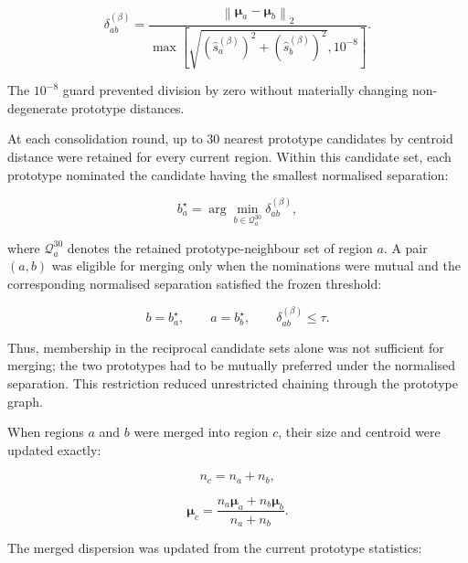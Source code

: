 \documentclass[10pt,a4paper,fleqn]{article}
\begin{document}
\begin{equation}
\delta_{ab}^{(\beta)}
=
\frac{
\left\|
\boldsymbol{\mu}_a-\boldsymbol{\mu}_b
\right\|_2
}{
\max
\left[
\sqrt{
\left(
\widehat{s}_a^{(\beta)}
\right)^2
+
\left(
\widehat{s}_b^{(\beta)}
\right)^2
},
10^{-8}
\right]
}.
\label{eq:prototype_distance}
\end{equation}

The \(10^{-8}\) guard prevented division by zero without materially changing
non-degenerate prototype distances.

At each consolidation round, up to 30 nearest prototype candidates by centroid
distance were retained for every current region. Within this candidate set,
each prototype nominated the candidate having the smallest normalised
separation:

\begin{equation}
b_a^{\star}
=
\arg\min_{b\in\mathcal{Q}^{30}_a}
\delta_{ab}^{(\beta)},
\label{eq:preferred_prototype}
\end{equation}

where \(\mathcal{Q}^{30}_a\) denotes the retained prototype-neighbour set of
region \(a\). A pair \((a,b)\) was eligible for merging only when the
nominations were mutual and the corresponding normalised separation satisfied
the frozen threshold:

\begin{equation}
b=b_a^{\star},
\qquad
a=b_b^{\star},
\qquad
\delta_{ab}^{(\beta)}\leq\tau.
\label{eq:reciprocal_merge_rule}
\end{equation}

Thus, membership in the reciprocal candidate sets alone was not sufficient
for merging; the two prototypes had to be mutually preferred under the
normalised separation. This restriction reduced unrestricted chaining through
the prototype graph.

When regions \(a\) and \(b\) were merged into region \(c\), their size and
centroid were updated exactly:

\begin{equation}
n_c
=
n_a+n_b,
\label{eq:merged_region_size}
\end{equation}

\begin{equation}
\boldsymbol{\mu}_c
=
\frac{
n_a\boldsymbol{\mu}_a+
n_b\boldsymbol{\mu}_b
}{
n_a+n_b
}.
\label{eq:merged_centroid}
\end{equation}

The merged dispersion was updated from the current prototype statistics:
\end{document}
